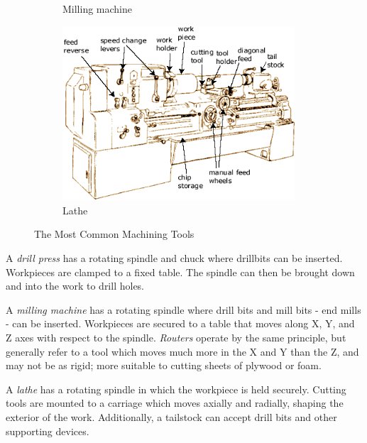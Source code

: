 \begin{figure}[H]
\begin{subfigure}[b]{.34\linewidth}
		\caption{Milling machine}
	\end{subfigure}	\begin{subfigure}[b]{.4\linewidth}
		\includegraphics[width=0.95\textwidth]{imgs/lathe.png}
		\caption{Lathe}
	\end{subfigure}	
	
	\caption{The Most Common Machining Tools}
\end{figure}

 \begin{asparaenum}[a)]
 	\item A \textit{drill press} has a rotating spindle and chuck where drillbits can be inserted. Workpieces are clamped to a fixed table. The spindle can then be brought down and into the work to drill holes.
 	\item A \textit{milling machine} has a rotating spindle where drill bits and mill bits - end mills - can be inserted. Workpieces are secured to a table that moves along X, Y, and Z axes with respect to the spindle. \textit{Routers} operate by the same principle, but generally refer to a tool which moves much more in the X and Y than the Z, and may not be as rigid; more suitable to cutting sheets of plywood or foam.
 	\item A \textit{lathe} has a rotating spindle in which the workpiece is held securely. Cutting tools are mounted to a carriage which moves axially and radially, shaping the exterior of the work. Additionally, a tailstock can accept drill bits and other supporting devices.
 \end{asparaenum}
 
